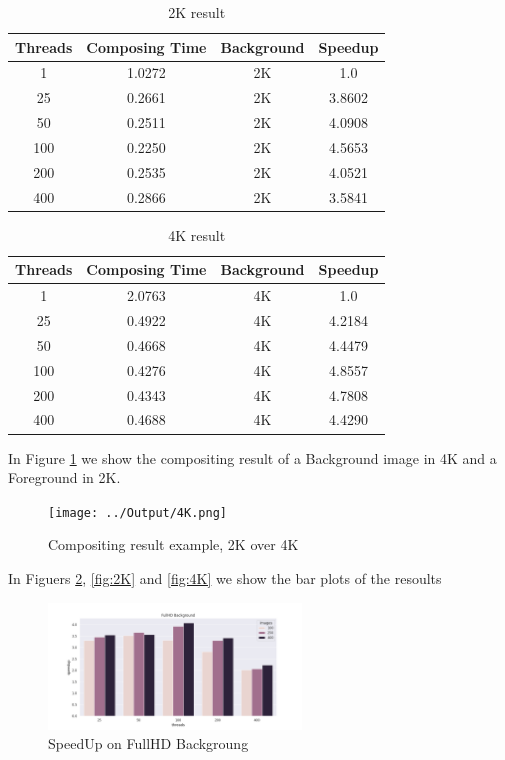 \documentclass[10pt,twocolumn,letterpaper,english]{article}
\begin{document}
\begin{table}[h]
	\centering
	\caption{2K result}
	\begin{tabular}{|c|c|c|c|}
		\hline
		\textbf{Threads} & \textbf{Composing Time} & \textbf{Background} & \textbf{Speedup} \\
		\hline
		1   & 1.0272 & 2K     & 1.0 \\
		25  & 0.2661 & 2K     & 3.8602 \\
		50  & 0.2511 & 2K     & 4.0908 \\
		100 & 0.2250 & 2K     & 4.5653 \\
		200 & 0.2535 & 2K     & 4.0521 \\
		400 & 0.2866 & 2K     & 3.5841 \\
		\hline
	\end{tabular}
	\label{tab:2k}
\end{table}

\begin{table}[h]
	\centering
	\caption{4K result}
	\begin{tabular}{|c|c|c|c|}
		\hline
		\textbf{Threads} & \textbf{Composing Time} & \textbf{Background} & \textbf{Speedup} \\
		\hline
		1   & 2.0763 & 4K     & 1.0 \\
		25  & 0.4922 & 4K     & 4.2184 \\
		50  & 0.4668 & 4K     & 4.4479 \\
		100 & 0.4276 & 4K     & 4.8557 \\
		200 & 0.4343 & 4K     & 4.7808 \\
		400 & 0.4688 & 4K     & 4.4290 \\
		\hline
	\end{tabular}
	\label{tab:4k}
\end{table}

In Figure \ref{fig:compositing} we show the compositing result of a Background image in 4K and a Foreground in 2K.

\begin{figure}[H]
	\caption{Compositing result example, 2K over 4K}
	\centering
	\label{fig:compositing}
	\texttt{[image: ../Output/4K.png]}
\end{figure}

In Figuers \ref{fig:fullhd}, \ref{fig:2K}  and \ref{fig:4K} we show the bar plots of the resoults

\begin{figure}[H]
	\caption{SpeedUp on FullHD Backgroung}
	\centering
	\label{fig:fullhd}
	\includegraphics[width=0.6\textwidth]{../plots/fullhd.png}
\end{figure}
\end{document}
